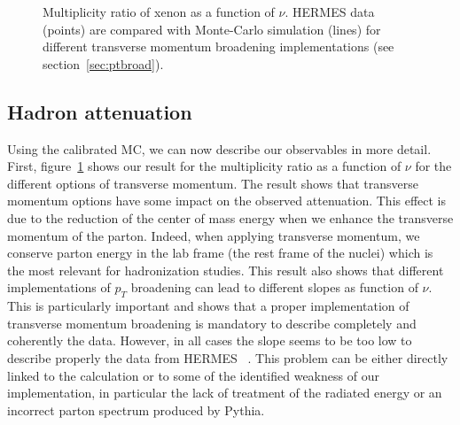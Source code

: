 \begin{figure}[tbp]
  \centering
{}
\caption {Multiplicity ratio of xenon as a function of $\nu$. HERMES data~%
\cite{Airapetian:2011jp} (points) are compared with Monte-Carlo simulation 
(lines) for different transverse momentum broadening implementations (see 
section~\ref{sec:ptbroad}).}
\label{fig:PtC-Rnu}
\end{figure}


\subsection{Hadron attenuation}

Using the calibrated MC, we can now describe our observables in more detail. 
First, figure~\ref{fig:PtC-Rnu} shows our result for the multiplicity 
ratio as a function of $\nu$ for the different options of transverse momentum. 
The result shows that transverse momentum options have some impact on the 
observed attenuation. This effect is due to the reduction of the center of mass 
energy when we enhance the transverse momentum of the parton. Indeed, when 
applying transverse momentum, we conserve parton energy in the lab frame (the 
rest frame of the nuclei) which is the most relevant for hadronization studies. 
This result also shows that different implementations of $p_T$ broadening can 
lead to different slopes as function of $\nu$. This is particularly important 
and shows that a proper implementation of transverse momentum broadening is 
mandatory to describe completely and coherently the data. However, in all 
cases the slope seems to be too low to describe properly the data from HERMES~%
\cite{Airapetian:2011jp}. This problem can be either directly linked to the 
calculation or to some of the identified weakness of our implementation, in 
particular the lack of treatment of the radiated energy or an incorrect parton 
spectrum produced by Pythia.

